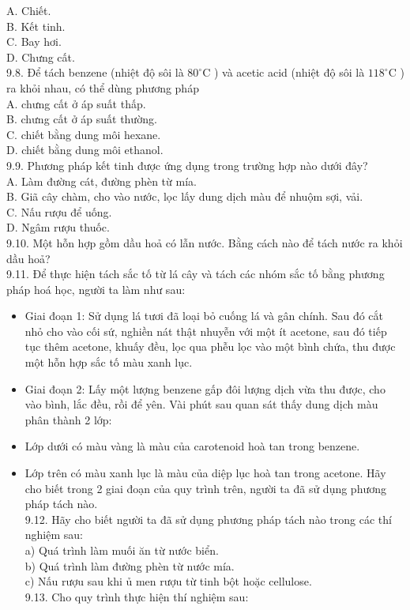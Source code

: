 \documentclass[10pt]{article}
\begin{document}
A. Chiết.\\
B. Kết tinh.\\
C. Bay hơi.\\
D. Chưng cất.\\
9.8. Để tách benzene (nhiệt độ sôi là $80^{\circ} \mathrm{C}$ ) và acetic acid (nhiệt độ sôi là $118^{\circ} \mathrm{C}$ ) ra khỏi nhau, có thể dùng phương pháp\\
A. chưng cất ở áp suất thấp.\\
B. chưng cất ở áp suất thường.\\
C. chiết bằng dung môi hexane.\\
D. chiết bằng dung môi ethanol.\\
9.9. Phương pháp kết tinh được ứng dụng trong trường hợp nào dưới đây?\\
A. Làm đường cát, đường phèn từ mía.\\
B. Giã cây chàm, cho vào nước, lọc lấy dung dịch màu để nhuộm sợi, vải.\\
C. Nấu rượu để uống.\\
D. Ngâm rượu thuốc.\\
9.10. Một hỗn hợp gồm dầu hoả có lẫn nước. Bằng cách nào để tách nước ra khỏi dầu hoả?\\
9.11. Để thực hiện tách sắc tố từ lá cây và tách các nhóm sắc tố bằng phương pháp hoá học, người ta làm như sau:

\begin{itemize}
  \item Giai đoạn 1: Sử dụng lá tươi đã loại bỏ cuống lá và gân chính. Sau đó cắt nhỏ cho vào cối sứ, nghiền nát thật nhuyễn với một ít acetone, sau đó tiếp tục thêm acetone, khuấy đều, lọc qua phễu lọc vào một bình chứa, thu được một hỗn hợp sắc tố màu xanh lục.
  \item Giai đoạn 2: Lấy một lượng benzene gấp đôi lượng dịch vừa thu được, cho vào bình, lắc đều, rồi để yên. Vài phút sau quan sát thấy dung dịch màu phân thành 2 lớp:
  \item Lớp dưới có màu vàng là màu của carotenoid hoà tan trong benzene.
  \item Lớp trên có màu xanh lục là màu của diệp lục hoà tan trong acetone. Hãy cho biết trong 2 giai đoạn của quy trình trên, người ta đã sử dụng phương pháp tách nào.\\
9.12. Hãy cho biết người ta đã sử dụng phương pháp tách nào trong các thí nghiệm sau:\\
a) Quá trình làm muối ăn từ nước biển.\\
b) Quá trình làm đường phèn từ nước mía.\\
c) Nấu rượu sau khi ủ men rượu từ tinh bột hoặc cellulose.\\
9.13. Cho quy trình thực hiện thí nghiệm sau:
\end{itemize}
\end{document}
